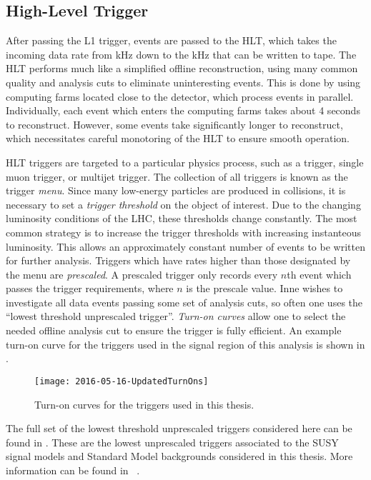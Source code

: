 \subsection{High-Level Trigger}

After passing the L1 trigger, events are passed to the HLT, which takes the incoming data rate from  kHz down to the  kHz that can be written to tape.
The HLT performs much like a simplified offline reconstruction, using many common quality and analysis cuts to eliminate uninteresting events.
This is done by using computing farms located close to the detector, which process events in parallel.
Individually, each event which enters the computing farms takes about 4 seconds to reconstruct.
However, some events take significantly longer to reconstruct, which necessitates careful monotoring of the HLT to ensure smooth operation.

HLT triggers are targeted to a particular physics process, such as a \met trigger, single muon trigger, or multijet trigger.
The collection of all triggers is known as the trigger \textit{menu}.
Since many low-energy particles are produced in collisions, it is necessary to set a \textit{trigger threshold} on the object of interest.
Due to the changing luminosity conditions of the LHC, these thresholds change constantly.
The most common strategy is to increase the trigger thresholds with increasing instanteous luminosity.
This allows an approximately constant number of events to be written for further analysis.
Triggers which have rates higher than those designated by the menu are \textit{prescaled}.
A prescaled trigger only records every $n$th event which passes the trigger requirements, where $n$ is the prescale value.
Inne wishes to investigate all data events passing some set of analysis cuts, so often one uses the ``lowest threshold unprescaled trigger''.
\textit{Turn-on curves} allow one to select the needed offline analysis cut to ensure the trigger is fully efficient.
An example turn-on curve for the \met triggers used in the signal region of this analysis is shown in .
\begin{figure}[hbtp]
\caption{Turn-on curves for the \met triggers used in this thesis.} \label{fig:met_turnon}
\texttt{[image: 2016-05-16-UpdatedTurnOns]}
\end{figure}

The full set of the lowest threshold unprescaled triggers considered here can be found in .
These are the lowest unprescaled triggers associated to the SUSY signal models and Standard Model backgrounds considered in this thesis.
More information can be found in ~\cite{ATL-DAQ-PUB-2016-001}.

